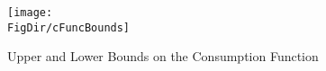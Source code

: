 \begin{figure}
\centering
\texttt{[image: \\FigDir/cFuncBounds]}
\caption{Upper and Lower Bounds on the Consumption Function}
\label{fig:cFuncBounds}
\end{figure}
